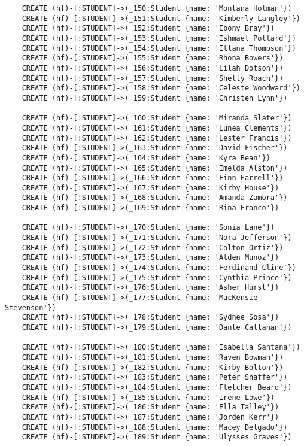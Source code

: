 \begin{lstlisting}
	CREATE (hf)-[:STUDENT]->(_150:Student {name: 'Montana Holman'})
	CREATE (hf)-[:STUDENT]->(_151:Student {name: 'Kimberly Langley'})
	CREATE (hf)-[:STUDENT]->(_152:Student {name: 'Ebony Bray'})
	CREATE (hf)-[:STUDENT]->(_153:Student {name: 'Ishmael Pollard'})
	CREATE (hf)-[:STUDENT]->(_154:Student {name: 'Illana Thompson'})
	CREATE (hf)-[:STUDENT]->(_155:Student {name: 'Rhona Bowers'})
	CREATE (hf)-[:STUDENT]->(_156:Student {name: 'Lilah Dotson'})
	CREATE (hf)-[:STUDENT]->(_157:Student {name: 'Shelly Roach'})
	CREATE (hf)-[:STUDENT]->(_158:Student {name: 'Celeste Woodward'})
	CREATE (hf)-[:STUDENT]->(_159:Student {name: 'Christen Lynn'})
	
	CREATE (hf)-[:STUDENT]->(_160:Student {name: 'Miranda Slater'})
	CREATE (hf)-[:STUDENT]->(_161:Student {name: 'Lunea Clements'})
	CREATE (hf)-[:STUDENT]->(_162:Student {name: 'Lester Francis'})
	CREATE (hf)-[:STUDENT]->(_163:Student {name: 'David Fischer'})
	CREATE (hf)-[:STUDENT]->(_164:Student {name: 'Kyra Bean'})
	CREATE (hf)-[:STUDENT]->(_165:Student {name: 'Imelda Alston'})
	CREATE (hf)-[:STUDENT]->(_166:Student {name: 'Finn Farrell'})
	CREATE (hf)-[:STUDENT]->(_167:Student {name: 'Kirby House'})
	CREATE (hf)-[:STUDENT]->(_168:Student {name: 'Amanda Zamora'})
	CREATE (hf)-[:STUDENT]->(_169:Student {name: 'Rina Franco'})
	
	CREATE (hf)-[:STUDENT]->(_170:Student {name: 'Sonia Lane'})
	CREATE (hf)-[:STUDENT]->(_171:Student {name: 'Nora Jefferson'})
	CREATE (hf)-[:STUDENT]->(_172:Student {name: 'Colton Ortiz'})
	CREATE (hf)-[:STUDENT]->(_173:Student {name: 'Alden Munoz'})
	CREATE (hf)-[:STUDENT]->(_174:Student {name: 'Ferdinand Cline'})
	CREATE (hf)-[:STUDENT]->(_175:Student {name: 'Cynthia Prince'})
	CREATE (hf)-[:STUDENT]->(_176:Student {name: 'Asher Hurst'})
	CREATE (hf)-[:STUDENT]->(_177:Student {name: 'MacKensie Stevenson'})
	CREATE (hf)-[:STUDENT]->(_178:Student {name: 'Sydnee Sosa'})
	CREATE (hf)-[:STUDENT]->(_179:Student {name: 'Dante Callahan'})
	
	CREATE (hf)-[:STUDENT]->(_180:Student {name: 'Isabella Santana'})
	CREATE (hf)-[:STUDENT]->(_181:Student {name: 'Raven Bowman'})
	CREATE (hf)-[:STUDENT]->(_182:Student {name: 'Kirby Bolton'})
	CREATE (hf)-[:STUDENT]->(_183:Student {name: 'Peter Shaffer'})
	CREATE (hf)-[:STUDENT]->(_184:Student {name: 'Fletcher Beard'})
	CREATE (hf)-[:STUDENT]->(_185:Student {name: 'Irene Lowe'})
	CREATE (hf)-[:STUDENT]->(_186:Student {name: 'Ella Talley'})
	CREATE (hf)-[:STUDENT]->(_187:Student {name: 'Jorden Kerr'})
	CREATE (hf)-[:STUDENT]->(_188:Student {name: 'Macey Delgado'})
	CREATE (hf)-[:STUDENT]->(_189:Student {name: 'Ulysses Graves'})
	

\end{lstlisting}
